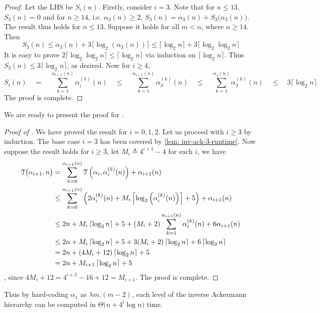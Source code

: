 \begin{proof}
	Let the LHS be $S_i(n)$. Firstly, consider $i = 3$. Note that for $n\le 13$, $S_3(n) = 0$ and for $n\ge 14$, i.e. $\alpha_3(n)\ge 2$, $S_3(n) = \alpha_3(n) + S_3\big(\alpha_3(n)\big)$. The result thus holds for $n\le 13$. Suppose it holds for all $m < n$, where $n\ge 14$. Then
	\begin{equation*}
	S_3(n) \le \alpha_3(n) + 3\big\lceil \log_2(\alpha_3(n)) \big\rceil \le \big\lceil \log_2n \big\rceil + 3\big\lceil \log_2\log_2n \big\rceil
	\end{equation*}
	It is easy to prove $2\big\lceil \log_2\log_2n \big\rceil \le \big\lceil \log_2n \big\rceil$ via induction on $\big\lceil \log_2n \big\rceil$. Thus $S_3(n)\le 3\big\lceil \log_2n \big\rceil$, as desired. Now for $i \ge 4$,
	\begin{equation*}
	S_i(n) \quad = \quad \sum_{k=1}^{\alpha_{i+1}(n)} \alpha_i^{(k)}(n) \quad \le \quad 
	\sum_{k=1}^{\alpha_{i+1}(n)} \alpha_3^{(k)}(n) \quad \le \quad 
	\sum_{k=1}^{\alpha_{4}(n)} \alpha_3^{(k)}(n) \quad \le \quad 
	3\big\lceil \log_2n \big\rceil
	\end{equation*}
	The proof is complete.	
\end{proof}
We are ready to present the proof for .
\begin{proof}[Proof of ]
	We have proved the result for $i = 0, 1, 2$. Let us proceed with $i\ge 3$ by induction. The base case $i = 3$ has been covered by \cref{lem: inv-ack-3-runtime}. Now suppose the result holds for $i\ge 3$, let $M_i \triangleq 4^{i+1}-4$ for each $i$, we have
	\begin{equation*}
	\begin{aligned}
	\mathcal{T}\big(\alpha_{i+1}, n\big) & = \sum_{k=0}^{\alpha_{i+1}(n)} \mathcal{T}\left(\alpha_i, \alpha_i^{(k)}(n)\right) + \alpha_{i+1}(n) \\
	& \le \sum_{k=0}^{\alpha_{i+1}(n)}\left(2\alpha_i^{(k)}(n) + M_i\left\lceil\log_2\left(\alpha_i^{(k)}(n)\right)\right\rceil + 5 \right) + \alpha_{i+1}(n) \\
	& \le 2n + M_i\left\lceil\log_2n\right\rceil + 5 + (M_i+2)\sum_{k=1}^{\alpha_{i+1}(n)}\alpha_i^{(k)}(n) + 6\alpha_{i+1}(n) \\
	& \le 2n + M_i\left\lceil\log_2n\right\rceil + 5 +
	3(M_i + 2)\left\lceil\log_2n\right\rceil + 6\left\lceil\log_2n\right\rceil \\
	& = 2n + (4M_i + 12)\left\lceil\log_2n\right\rceil + 5 \\
	& = 2n + M_{i+1}\left\lceil\log_2n\right\rceil + 5
	\end{aligned}
	\end{equation*}
	, since $4M_i + 12 = 4^{i+2} - 16 + 12 = M_{i+1}$. The proof is complete.
\end{proof}
Thus by hard-coding $\alpha_1$ as $\lambda m.(m-2)$, each level of the inverse Ackermann hierarchy can be computed in $\Theta\big(n + 4^i\log n\big)$ time.

